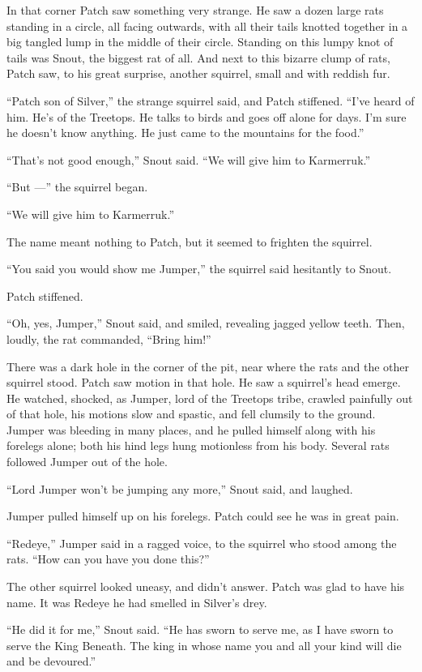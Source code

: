 \documentclass[12pt]{memoir}
\begin{document}
In that corner Patch saw something very strange. He saw a dozen large
rats standing in a circle, all facing outwards, with all their tails
knotted together in a big tangled lump in the middle of their
circle. Standing on this lumpy knot of tails was Snout, the biggest
rat of all. And next to this bizarre clump of rats, Patch saw, to his
great surprise, another squirrel, small and with reddish fur.

“Patch son of Silver,” the strange squirrel said, and Patch
stiffened. “I’ve heard of him. He’s of the Treetops. He talks to birds
and goes off alone for days. I’m sure he doesn’t know anything. He
just came to the mountains for the food.”

“That’s not good enough,” Snout said. “We will give him to Karmerruk.”

“But —” the squirrel began.

“We will give him to Karmerruk.”

The name meant nothing to Patch, but it seemed to frighten the
squirrel.

“You said you would show me Jumper,” the squirrel said hesitantly to
Snout.

Patch stiffened.

“Oh, yes, Jumper,” Snout said, and smiled, revealing jagged yellow
teeth. Then, loudly, the rat commanded, “Bring him!”

There was a dark hole in the corner of the pit, near where the rats
and the other squirrel stood. Patch saw motion in that hole. He saw a
squirrel’s head emerge. He watched, shocked, as Jumper, lord of the
Treetops tribe, crawled painfully out of that hole, his motions slow
and spastic, and fell clumsily to the ground. Jumper was bleeding in
many places, and he pulled himself along with his forelegs alone; both
his hind legs hung motionless from his body. Several rats followed
Jumper out of the hole.

“Lord Jumper won’t be jumping any more,” Snout said, and laughed.

Jumper pulled himself up on his forelegs. Patch could see he was in
great pain.

“Redeye,” Jumper said in a ragged voice, to the squirrel who stood
among the rats. “How can you have you done this?”

The other squirrel looked uneasy, and didn’t answer. Patch was glad to
have his name. It was Redeye he had smelled in Silver’s drey.

“He did it for me,” Snout said. “He has sworn to serve me, as I have
sworn to serve the King Beneath. The king in whose name you and all
your kind will die and be devoured.”
\end{document}
